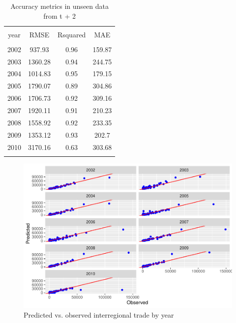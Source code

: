 \documentclass[sigconf]{acmart}
\begin{document}
\begin{table}[!htbp] \centering 
	\caption{Accuracy metrics in unseen data from t + 2\label{accuracy_test}} 
	\label{} 
	\footnotesize 
	\begin{tabular}{@{\extracolsep{0pt}} cccc} 
		\\[-1.8ex]\hline 
		\hline \\[-1.8ex] 
		year & RMSE & Rsquared & MAE \\ 
		\hline \\[-1.8ex] 
		2002 & 937.93 & 0.96 & 159.87 \\ 
		2003 & 1360.28 & 0.94 & 244.75 \\ 
		2004 & 1014.83 & 0.95 & 179.15 \\ 
		2005 & 1790.07 & 0.89 & 304.86 \\ 
		2006 & 1706.73 & 0.92 & 309.16 \\ 
		2007 & 1920.11 & 0.91 & 210.23 \\ 
		2008 & 1558.92 & 0.92 & 233.35 \\ 
		2009 & 1353.12 & 0.93 & 202.7 \\ 
		2010 & 3170.16 & 0.63 & 303.68 \\ 
		\hline \\[-1.8ex] 
	\end{tabular} 
\end{table}

\begin{figure}[p]
	\includegraphics[width=1\linewidth]{hl_files/figure-latex/unnamed-chunk-5-1} \caption{\label{prediction}Predicted vs. observed interregional trade by year}\label{fig:unnamed-chunk-5}
\end{figure}
\end{document}
